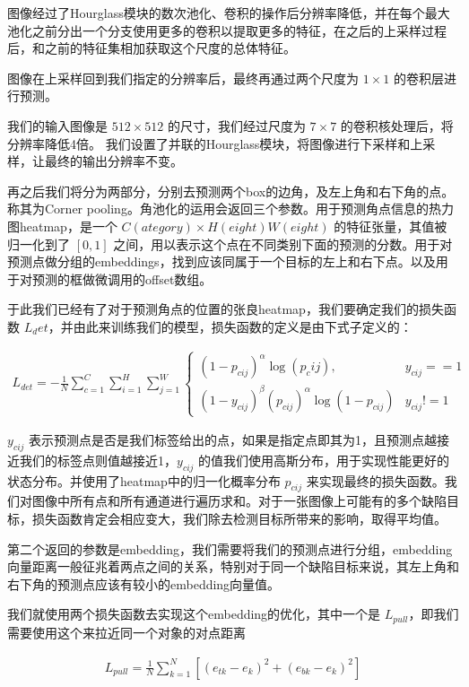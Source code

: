 图像经过了Hourglass模块的数次池化、卷积的操作后分辨率降低，并在每个最大池化之前分出一个分支使用更多的卷积以提取更多的特征，在之后的上采样过程后，和之前的特征集相加获取这个尺度的总体特征。

图像在上采样回到我们指定的分辨率后，最终再通过两个尺度为 $ 1 \times 1 $ 的卷积层进行预测。

我们的输入图像是 $ 512 \times 512 $ 的尺寸，我们经过尺度为 $ 7 \times 7 $ 的卷积核处理后，将分辨率降低4倍。 我们设置了并联的Hourglass模块，将图像进行下采样和上采样，让最终的输出分辨率不变。

再之后我们将分为两部分，分别去预测两个box的边角，及左上角和右下角的点。称其为Corner pooling。角池化的运用会返回三个参数。用于预测角点信息的热力图heatmap，是一个 $ C(ategory) \times H(eight) W(eight) $ 的特征张量，其值被归一化到了 $ [0,1] $ 之间，用以表示这个点在不同类别下面的预测的分数。用于对预测点做分组的embeddings，找到应该同属于一个目标的左上和右下点。以及用于对预测的框做微调用的offset数组。

于此我们已经有了对于预测角点的位置的张良heatmap，我们要确定我们的损失函数 $ L_det $，并由此来训练我们的模型，损失函数的定义是由下式子定义的：

\begin{eqnarray}
    L_{det} = -\frac{1}{N} \sum^{C}_{c=1}\sum^{H}_{i=1}\sum^{W}_{j=1} \left\{  
        \begin{array}{lr}  
        (1-p_{cij})^{\alpha}\log(p_cij), & y_{cij} == 1\\  
        (1-y_{cij})^{\beta}(p_{cij})^{\alpha}\log(1-p_{cij}) & y_{cij} != 1    
        \end{array}  
\right.  
\end{eqnarray}

$ y_{cij} $ 表示预测点是否是我们标签给出的点，如果是指定点即其为1，且预测点越接近我们的标签点则值越接近1，$ y_{cij} $ 的值我们使用高斯分布，用于实现性能更好的状态分布。并使用了heatmap中的归一化概率分布 $ p_{cij} $ 来实现最终的损失函数。我们对图像中所有点和所有通道进行遍历求和。对于一张图像上可能有的多个缺陷目标，损失函数肯定会相应变大，我们除去检测目标所带来的影响，取得平均值。

第二个返回的参数是embedding，我们需要将我们的预测点进行分组，embedding向量距离一般征兆着两点之间的关系，特别对于同一个缺陷目标来说，其左上角和右下角的预测点应该有较小的embedding向量值。

我们就使用两个损失函数去实现这个embedding的优化，其中一个是 $ L_{pull} $，即我们需要使用这个来拉近同一个对象的对点距离

\begin{eqnarray}
    L_{pull} = \frac{1}{N}\sum^{N}_{k=1}[(e_{tk}-e_k)^2+(e_{bk}-e_k)^2]
\end{eqnarray}

